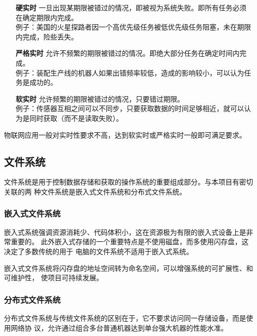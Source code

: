 \documentclass{ctexart}
\begin{document}
\begin{itemize}
	\item[\textbf{硬实时}] 一旦出现某期限被错过的情况，即被视为系统失败。即所有任务必须在确定期限内完成。\\
	例子：美国的火星探路者因一个高优先级任务被低优先级任务阻塞，未在期限内完成，险些丢失。
	\item[\textbf{严格实时}] 允许不频繁的期限被错过的情况。即绝大部分任务在确定时间内完成。\\
	例子：装配生产线的机器人如果出错频率较低，造成的影响较小，可以认为任务是成功的。
	\item[\textbf{软实时}] 允许频繁的期限被错过的情况，只要错过期限。\\
	例子：传感器互相之间可以不同步，只要获取数据的时间足够相近，就可以认为是同时获取（而不是读取失败）。
\end{itemize}

物联网应用一般对实时性要求不高，达到软实时或严格实时一般即可满足要求。

\subsection{文件系统}

文件系统是用于控制数据存储和获取的操作系统的重要组成部分。与本项目有密切关联的两
种文件系统是嵌入式文件系统和分布式文件系统。

\subsubsection{嵌入式文件系统}

嵌入式系统强调资源消耗少、代码体积小，这在资源极为有限的嵌入式设备上是非常重要的。
此外嵌入式存储的一个重要特点是不使用磁盘，而多使用闪存盘，这决定了多数传统的用于
电脑的文件系统不适用于嵌入式系统。

嵌入式文件系统将闪存盘的地址空间转为命名空间，可以增强系统的可扩展性、和可维护性，
使项目可持续发展。

\subsubsection{分布式文件系统}

分布式文件系统与传统文件系统的区别在于，它不要求访问同一存储设备，而是使用网络协
议，允许通过组合多台普通机器达到单台强大机器的性能水准。
\end{document}
